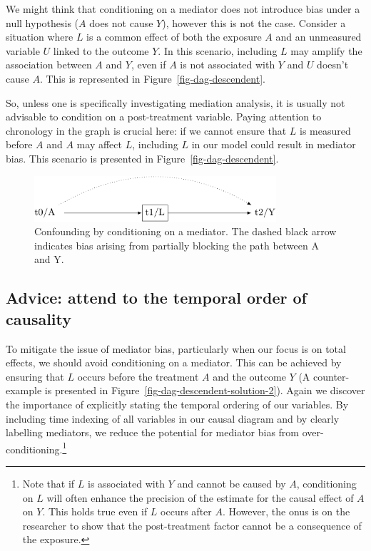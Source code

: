 \documentclass[
  singlecolumn]{report}
\begin{document}
We might think that conditioning on a mediator does not introduce bias
under a null hypothesis (\(A\) does not cause \(Y\)), however this is
not the case. Consider a situation where \(L\) is a common effect of
both the exposure \(A\) and an unmeasured variable \(U\) linked to the
outcome \(Y\). In this scenario, including \(L\) may amplify the
association between \(A\) and \(Y\), even if \(A\) is not associated
with \(Y\) and \(U\) doesn't cause \(A\). This is represented in
Figure~\ref{fig-dag-descendent}.

So, unless one is specifically investigating mediation analysis, it is
usually not advisable to condition on a post-treatment variable. Paying
attention to chronology in the graph is crucial here: if we cannot
ensure that \(L\) is measured before \(A\) and \(A\) may affect \(L\),
including \(L\) in our model could result in mediator bias. This
scenario is presented in Figure~\ref{fig-dag-descendent}.

\begin{figure}

{\centering \includegraphics[width=0.8\textwidth,height=\textheight]{causal-dags_files/figure-pdf/fig-dag-mediator-1.pdf}

}

\caption{\label{fig-dag-mediator}Confounding by conditioning on a
mediator. The dashed black arrow indicates bias arising from partially
blocking the path between A and Y.}

\end{figure}

\hypertarget{advice-attend-to-the-temporal-order-of-causality}{%
\subsection{Advice: attend to the temporal order of
causality}\label{advice-attend-to-the-temporal-order-of-causality}}

To mitigate the issue of mediator bias, particularly when our focus is
on total effects, we should avoid conditioning on a mediator. This can
be achieved by ensuring that \(L\) occurs before the treatment \(A\) and
the outcome \(Y\) (A counter-example is presented in
Figure~\ref{fig-dag-descendent-solution-2}). Again we discover the
importance of explicitly stating the temporal ordering of our variables.
By including time indexing of all variables in our causal diagram and by
clearly labelling mediators, we reduce the potential for mediator bias
from over-conditioning.\footnote{Note that if \(L\) is associated with
  \(Y\) and cannot be caused by \(A\), conditioning on \(L\) will often
  enhance the precision of the estimate for the causal effect of \(A\)
  on \(Y\). This holds true even if \(L\) occurs after \(A\). However,
  the onus is on the researcher to show that the post-treatment factor
  cannot be a consequence of the exposure.}
\end{document}
